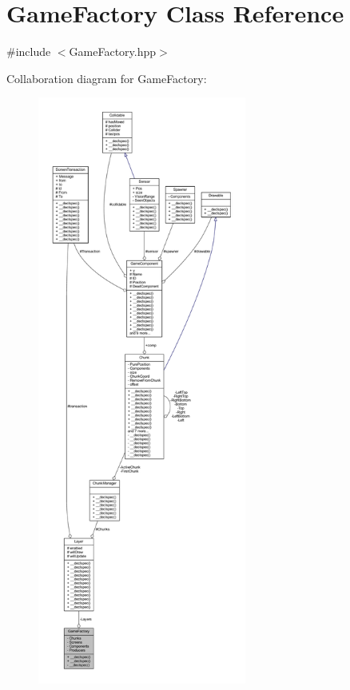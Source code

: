 \hypertarget{class_game_factory}{\section{Game\-Factory Class Reference}
\label{class_game_factory}
}


{\ttfamily \#include $<$Game\-Factory.\-hpp$>$}



Collaboration diagram for Game\-Factory\-:
\nopagebreak
\begin{figure}[H]
\begin{center}
\leavevmode
\includegraphics[height=550pt]{class_game_factory__coll__graph}
\end{center}
\end{figure}
